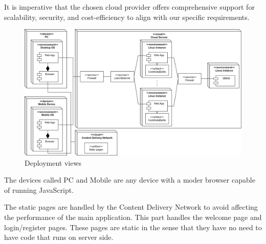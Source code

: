 \documentclass[12pt, a4paper]{report}
\begin{document}
    It is imperative that the chosen cloud provider offers comprehensive support for scalability, security, and cost-efficiency to align with our specific requirements.
    \begin{figure}[H]
        \centering
        \includegraphics[width=0.9\linewidth]{images/deployment_view.png}
        \caption{Deployment views}
    \end{figure}
    The devices called PC and Mobile are any device with a moder browser capable of running JavaScript. 
    
    The static pages are handled by the Content Delivery Network to avoid affecting the performance of the main application. 
    This part handles the welcome page and login/register pages. 
    These pages are static in the sense that they have no need to have code that runs on server side. 
\end{document}
